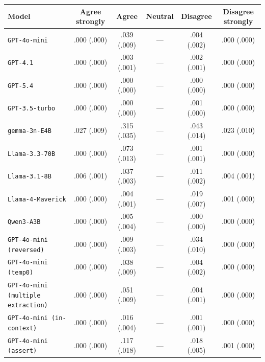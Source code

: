 \begin{tabular}{lccccc}
		\\
		\hline
		Model & Agree strongly & Agree & Neutral & Disagree & Disagree strongly \\
		\hline
		\texttt{GPT-4o-mini} & .000 (.000) & .039 (.009) & --- & .004 (.002) & .000 (.000) \\
		\texttt{GPT-4.1} & .000 (.000) & .003 (.001) & --- & .002 (.001) & .000 (.000) \\
		\texttt{GPT-5.4} & .000 (.000) & .000 (.000) & --- & .000 (.000) & .000 (.000) \\
		\texttt{GPT-3.5-turbo} & .000 (.000) & .000 (.000) & --- & .001 (.000) & .000 (.000) \\
		\texttt{gemma-3n-E4B} & .027 (.009) & .315 (.035) & --- & .043 (.014) & .023 (.010) \\
		\texttt{Llama-3.3-70B} & .000 (.000) & .073 (.013) & --- & .001 (.001) & .000 (.000) \\
		\texttt{Llama-3.1-8B} & .006 (.001) & .037 (.003) & --- & .011 (.002) & .004 (.001) \\
		\texttt{Llama-4-Maverick} & .000 (.000) & .004 (.001) & --- & .019 (.007) & .001 (.000) \\
		\texttt{Qwen3-A3B} & .000 (.000) & .005 (.004) & --- & .000 (.000) & .000 (.000) \\
		\texttt{GPT-4o-mini (reversed)} & .000 (.000) & .009 (.003) & --- & .034 (.010) & .000 (.000) \\
		\texttt{GPT-4o-mini (temp0)} & .000 (.000) & .038 (.009) & --- & .004 (.002) & .000 (.000) \\
		\texttt{GPT-4o-mini (multiple extraction)} & .000 (.000) & .051 (.009) & --- & .004 (.001) & .000 (.000) \\
		\texttt{GPT-4o-mini (in-context)} & .000 (.000) & .016 (.004) & --- & .001 (.001) & .000 (.000) \\
		\texttt{GPT-4o-mini (assert)} & .000 (.000) & .117 (.018) & --- & .018 (.005) & .001 (.000) \\
		\hline
\end{tabular}


